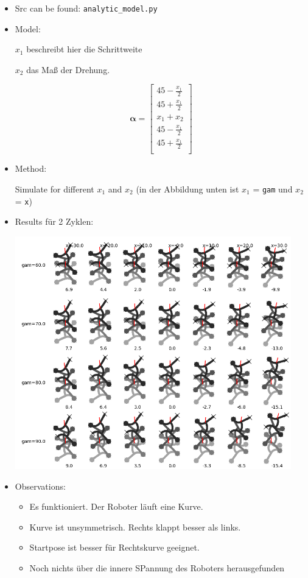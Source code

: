 \documentclass[10pt,a4paper]{article}
\begin{document}
\begin{itemize}

\item Src can be found: \texttt{analytic\_model.py}

\item Model:

$x_1$ beschreibt hier die Schrittweite

$x_2$ das Maß der Drehung.

\begin{equation}
\bm{\alpha} = \begin{bmatrix}
45 - \frac{x_1}{2} \\
45 + \frac{x_1}{2} \\
x_1 + x_2 \\
45 - \frac{x_1}{2}  \\
45 + \frac{x_1}{2} \\
\end{bmatrix}
\end{equation}

\item Method:

Simulate for different $x_1$ and $x_2$ (in der Abbildung unten ist $x_1$ = \texttt{gam} und $x_2$ = \texttt{x})

\item Results für 2 Zyklen:

\includegraphics[width=12cm]{../pics/model_1/GeckoBotGait_2cyc.png}


\item Observations:

\begin{itemize}
	\item Es funktioniert. Der Roboter läuft eine Kurve.
	\item Kurve ist unsymmetrisch. Rechts klappt besser als links.
	\item Startpose ist besser für Rechtskurve geeignet.
	\item Noch nichts über die innere SPannung des Roboters herausgefunden
\end{itemize}



\end{itemize}
\end{document}

